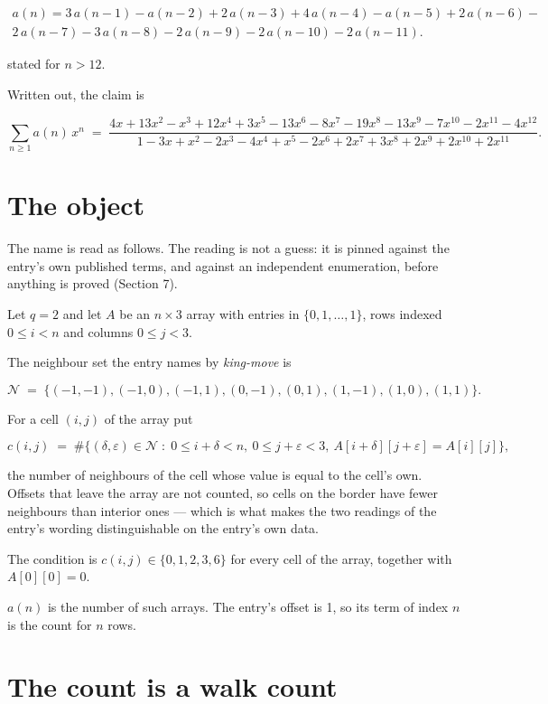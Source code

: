 \documentclass[11pt]{article}
\theoremstyle{definition}
\begin{document}
\begin{multline*} a(n) = 3\,a(n-1) - a(n-2) + 2\,a(n-3) + 4\,a(n-4) - a(n-5) + 2\,a(n-6) - \\ 2\,a(n-7) - 3\,a(n-8) - 2\,a(n-9) - 2\,a(n-10) - 2\,a(n-11). \end{multline*}

stated for $n > 12$.

Written out, the claim is

\[\sum_{n \ge 1} a(n)\,x^n \;=\; \frac{4x + 13x^{2} - x^{3} + 12x^{4} + 3x^{5} - 13x^{6} - 8x^{7} - 19x^{8} - 13x^{9} - 7x^{10} - 2x^{11} - 4x^{12}}{1 - 3x + x^{2} - 2x^{3} - 4x^{4} + x^{5} - 2x^{6} + 2x^{7} + 3x^{8} + 2x^{9} + 2x^{10} + 2x^{11}}.\]

\section{The object}

The name is read as follows. The reading is not a guess: it is pinned against the entry's own published terms, and against an independent enumeration, before anything is proved (Section 7).

Let $q = 2$ and let $A$ be an $n \times 3$ array with entries in $\{0,1,\dots,1\}$, rows indexed $0 \le i < n$ and columns $0 \le j < 3$.

The neighbour set the entry names by {\itshape king-move} is

\[\mathcal{N} \;=\; \{(-1,-1), (-1,0), (-1,1), (0,-1), (0,1), (1,-1), (1,0), (1,1)\}.\]

For a cell $(i,j)$ of the array put

\[c(i,j) \;=\; \#\bigl\{(\delta,\varepsilon)\in\mathcal{N} \;:\; 0\le i+\delta<n,\ 0\le j+\varepsilon<3,\ A[i+\delta][j+\varepsilon] = A[i][j]\bigr\},\]

the number of neighbours of the cell whose value is equal to the cell's own. Offsets that leave the array are not counted, so cells on the border have fewer neighbours than interior ones --- which is what makes the two readings of the entry's wording distinguishable on the entry's own data.

The condition is $c(i,j) \in \{0, 1, 2, 3, 6\}$ for every cell of the array, together with $A[0][0]=0$.

$a(n)$ is the number of such arrays. The entry's offset is 1, so its term of index $n$ is the count for $n$ rows.

\section{The count is a walk count}
\end{document}
